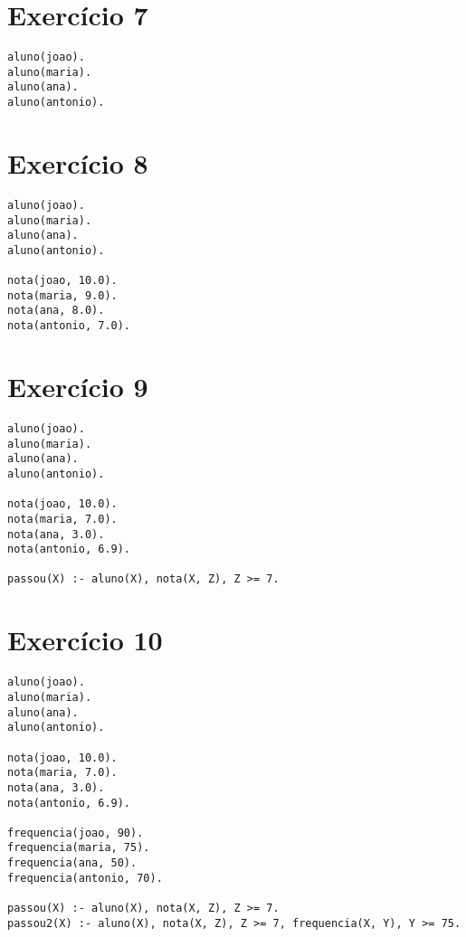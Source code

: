 \documentclass[12pt,a4paper,brazil]{article}
\begin{document}
\section*{Exercício 7}
\begin{lstlisting}
aluno(joao).
aluno(maria).
aluno(ana).
aluno(antonio).
\end{lstlisting}

\section*{Exercício 8}
\begin{lstlisting}
aluno(joao).
aluno(maria).
aluno(ana).
aluno(antonio).

nota(joao, 10.0).
nota(maria, 9.0).
nota(ana, 8.0).
nota(antonio, 7.0).
\end{lstlisting}

\section*{Exercício 9}
\begin{lstlisting}
aluno(joao).
aluno(maria).
aluno(ana).
aluno(antonio).

nota(joao, 10.0).
nota(maria, 7.0).
nota(ana, 3.0).
nota(antonio, 6.9).

passou(X) :- aluno(X), nota(X, Z), Z >= 7.
\end{lstlisting}

\section*{Exercício 10}
\begin{lstlisting}
aluno(joao).
aluno(maria).
aluno(ana).
aluno(antonio).

nota(joao, 10.0).
nota(maria, 7.0).
nota(ana, 3.0).
nota(antonio, 6.9).

frequencia(joao, 90).
frequencia(maria, 75).
frequencia(ana, 50).
frequencia(antonio, 70).

passou(X) :- aluno(X), nota(X, Z), Z >= 7.
passou2(X) :- aluno(X), nota(X, Z), Z >= 7, frequencia(X, Y), Y >= 75.
\end{lstlisting}
\end{document}
